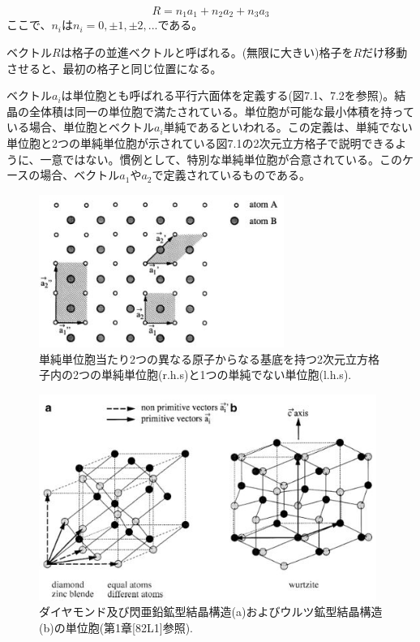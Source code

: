 \documentclass[11pt,a4j,uplatex]{jsarticle}
\begin{document}
\begin{equation}
  R=n_1a_1+n_2a_2+n_3a_3\tag{7.6}
\end{equation}
ここで、$n_i$は$n_i=0,\pm1,\pm2,...$である。

ベクトル$R$は格子の並進ベクトルと呼ばれる。(無限に大きい)格子を$R$だけ移動させると、最初の格子と同じ位置になる。

ベクトル$a_i$は単位胞とも呼ばれる平行六面体を定義する(図7.1、7.2を参照)。結晶の全体積は同一の単位胞で満たされている。単位胞が可能な最小体積を持っている場合、単位胞とベクトル$a_i$単純であるといわれる。この定義は、単純でない単位胞と2つの単純単位胞が示されている図7.1の2次元立方格子で説明できるように、一意ではない。慣例として、特別な単純単位胞が合意されている。このケースの場合、ベクトル$a_1$や$a_2$で定義されているものである。

\begin{figure}[tb]
 \centering
 \includegraphics[clip,width=8cm]{7_1.JPG}
 \caption{単純単位胞当たり2つの異なる原子からなる基底を持つ2次元立方格子内の2つの単純単位胞(r.h.s)と1つの単純でない単位胞(l.h.s).}
 \label{7.1}
\end{figure}

\begin{figure}[tb]
 \centering
 \includegraphics[clip,width=11cm]{7_2.JPG}
 \caption{ダイヤモンド及び閃亜鉛鉱型結晶構造(a)およびウルツ鉱型結晶構造(b)の単位胞(第1章[82L1]参照).}
 \label{7.2}
\end{figure}
\end{document}
